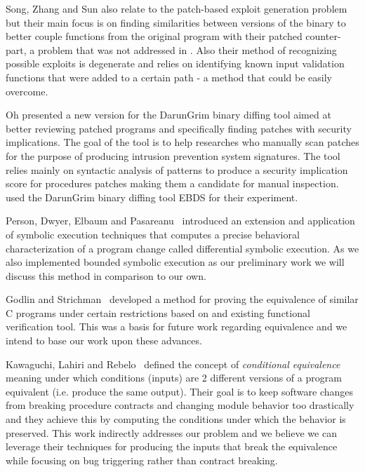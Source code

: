 Song, Zhang and Sun \cite{AutoBinary} also relate to the patch-based exploit generation problem but their main focus is on finding similarities between versions of the binary to better couple functions from the original program with their patched counter-part, a problem that was not addressed in \cite{AutoPatch}. Also their method of recognizing possible exploits is degenerate and relies on identifying known input validation functions that were added to a certain path - a method that could be easily overcome.

Oh \cite{DarunGrim3} presented a new version for the DarunGrim binary diffing tool aimed at better reviewing patched programs and specifically finding patches with security implications. The goal of the tool is to help researches who manually scan patches for the purpose of producing intrusion prevention system signatures. The tool relies mainly on syntactic analysis of patterns to produce a security implication score for procedures patches making them a candidate for manual inspection. \cite{AutoPatch} used the DarunGrim binary diffing tool EBDS for their experiment.

Person, Dwyer, Elbaum and Pasareanu~\cite{DEP:FSE08} introduced an extension and
application of symbolic execution techniques that computes a
precise behavioral characterization of a program change called
differential symbolic execution. As we also implemented bounded
symbolic execution as our preliminary work we will discuss this
method in comparison to our own.

Godlin and Strichman~\cite{GS09} developed a
method for proving the equivalence of similar C programs under
certain restrictions based on and existing functional verification
tool. This was a basis for future work regarding equivalence and
we intend to base our work upon these advances.

Kawaguchi, Lahiri and Rebelo~\cite{LHKR:CAV12} defined the concept of
\textit{conditional equivalence} meaning under which conditions
(inputs) are 2 different versions of a program equivalent (i.e.
produce the same output). Their goal is to keep software changes
from breaking procedure contracts and changing module behavior too
drastically and they achieve this by computing the conditions
under which the behavior is preserved. This work indirectly
addresses our problem and we believe we can leverage their
techniques for producing the inputs that break the equivalence
while focusing on bug triggering rather than contract breaking.




